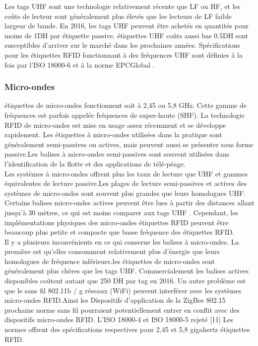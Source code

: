 \documentclass[11pt, a4paper, twoside]{book}
\begin{document}
Les tags UHF sont une technologie relativement récente que LF ou HF, et les coûts de lecteur sont généralement plus élevés que les lecteurs de LF faible largeur de bande. En 2016, les tags UHF peuvent être achetés en quantités pour moins de 1DH par étiquette passive. étiquettes UHF coûts aussi bas  0.5DH sont susceptibles d'arriver sur le marché dans les prochaines années. Spécifications pour les étiquettes RFID fonctionnant à des fréquences UHF sont définies à la fois par l'ISO 18000-6 et à la norme EPCGlobal .
\subsubsection{Micro-ondes} 
étiquettes de micro-ondes fonctionnent soit à 2,45 ou 5,8 GHz. Cette gamme de fréquences est parfois appelée fréquences de super-haute (SHF). La technologie RFID de micro-ondes est mise en usage assez récemment et se développe rapidement. Les étiquettes à micro-ondes utilisées dans la pratique sont généralement semi-passives ou actives, mais peuvent aussi se présenter sous forme passive.Les balises à micro-ondes semi-passives sont souvent utilisées dans l'identification de la flotte et des applications de télé-péage.\\


Les systèmes à micro-ondes offrent plus les taux de lecture que UHF et gammes équivalentes de lecture passive.Les plages de lecture semi-passives et actives des systèmes de micro-ondes sont souvent plus grandes que leurs homologues UHF. Certains balises micro-ondes actives peuvent être lues à partir des distances allant jusqu'à 30 mètres, ce qui est moins comparer aux tags UHF . Cependant, les implémentations physiques des micro-ondes étiquettes RFID peuvent être beaucoup plus petite et compacte que basse fréquence des étiquettes RFID.\\


Il y a plusieurs inconvénients en ce qui conserne les balises à micro-ondes. La première est qu'elles consomment relativement plus d'énergie que leurs homologues de fréquence inférieure.les étiquettes de micro-ondes sont généralement plus chères que les tags UHF. Commercialement les balises actives disponibles coûtent autant que 250 DH par tag en 2016.
Un autre problème est que le sans fil 802.11b / g réseaux (WiFi) peuvent interférer avec les systèmes micro-ondes RFID.Ainsi les Dispositifs d'application de la ZigBee 802.15 prochaine norme sans fil pourraient potentiellement entrer en conflit avec des dispositifs micro-ondes RFID.
L'ISO 18000-4 et ISO 18000-5 rejeté [11] Les normes offrent des spécifications respectives pour 2,45 et 5,8 gigahertz étiquettes RFID.
\end{document}
